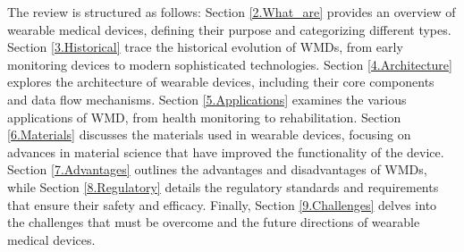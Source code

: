 \documentclass[journal]{IEEEtran}
\begin{document}
The review is structured as follows: Section \ref{2.What_are} provides an overview of wearable medical devices, defining their purpose and categorizing different types. Section \ref{3.Historical} trace the historical evolution of WMDs, from early monitoring devices to modern sophisticated technologies. Section \ref{4.Architecture} explores the architecture of wearable devices, including their core components and data flow mechanisms. Section \ref{5.Applications} examines the various applications of WMD, from health monitoring to rehabilitation. Section \ref{6.Materials} discusses the materials used in wearable devices, focusing on advances in material science that have improved the functionality of the device. Section \ref{7.Advantages} outlines the advantages and disadvantages of WMDs, while Section \ref{8.Regulatory} details the regulatory standards and requirements that ensure their safety and efficacy. Finally, Section \ref{9.Challenges} delves into the challenges that must be overcome and the future directions of wearable medical devices.



%
%

\end{document}
